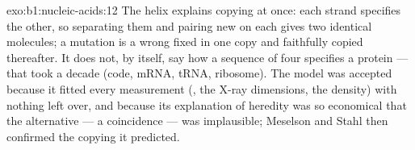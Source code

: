 \begin{solution}{exo:b1:nucleic-acids:12}
The helix explains copying at once: each strand specifies the other,
so separating them and pairing new  on each gives two
identical molecules; a mutation is a wrong  fixed in one copy and
faithfully copied thereafter. It does not, by itself, say how a
sequence of four  specifies a protein --- that took a decade
(code, mRNA, tRNA, ribosome). The model was accepted because it fitted
every measurement (, the X-ray dimensions, the density) with
nothing left over, and because its explanation of heredity was so
economical that the alternative --- a coincidence --- was implausible;
Meselson and Stahl then confirmed the copying it predicted.
\end{solution}

